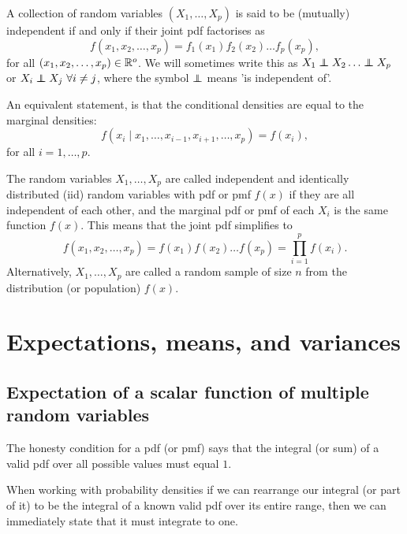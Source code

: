 \documentclass[10pt, a4paper]{article}
\begin{document}
\begin{definition}[Independence]
    A collection of random variables $(X_1, \dotsc, X_p)$ is said to be
    (mutually)
    independent if and only if their joint pdf factorises as
    \[
    f(x_1, x_2, \dotsc, x_p) = f_1(x_1)f_2(x_2)\dotsc f_p(x_p),
    \]
    for all $(x_1, x_2, \dotsc, x_p) \in \mathbb{R} ^ o$.
    We will sometimes write this as $X_1 \independent X_2 \dotsc \independent X_p$ or $X_i \independent X_j\ \forall i \neq j$,
    where the symbol $\independent$ means 'is independent of'.

    An equivalent statement,
    is that the conditional densities are equal to the marginal densities:
    \[
    f(x_i \mid x_1, \dotsc, x_{i - 1}, x_{i + 1}, \dotsc, x_p) = f(x_i),
    \]
    for all $i = 1, \dotsc, p$.
\end{definition}

\begin{definition}
    The random variables $X_1, \dotsc, X_p$ are called independent and identically distributed
    (iid)
    random variables with pdf or pmf $f(x)$ if they are all independent of each other,
    and the marginal pdf or pmf of each $X_i$ is the same function $f(x)$.
    This means that the joint pdf simplifies to
    \[
    f(x_1, x_2, \dotsc, x_p) = f(x_1)f(x_2) \dotsc f(x_p) = \prod_{i = 1}^{p}f(x_i).
    \]
    Alternatively,
    $X_1, \dotsc, X_p$ are called a random sample of size $n$ from the distribution
    (or population)
    $f(x)$.
\end{definition}

\newpage

\section{Expectations,
means,
and variances}

\subsection{Expectation of a scalar function of multiple random variables}

\begin{definition}
    The honesty condition for a pdf
    (or pmf)
    says that the integral
    (or sum)
    of a valid pdf over all possible values must equal $1$.
\end{definition}

\begin{remark}
    When working with probability densities if we can rearrange our integral
    (or part of it)
    to be the integral of a known valid pdf over its entire range,
    then we can immediately state that it must integrate to one.
\end{remark}
\end{document}
